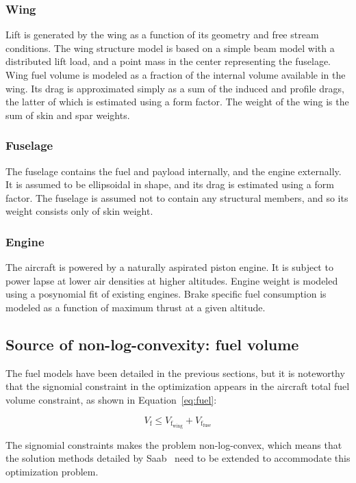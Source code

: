 \subsubsection{Wing}

Lift is generated by the wing as a function of its geometry and free stream conditions.
The wing structure model is based on a simple beam model with a distributed lift load,
and a point mass in the center representing the fuselage.
Wing fuel volume is modeled as a fraction of the internal volume available in the wing.
Its drag is
approximated simply as a sum of the induced and profile drags, the latter of which is estimated using a
form factor. The weight of the wing is the sum of skin and spar weights.

\subsubsection{Fuselage}

The fuselage contains the fuel and payload internally, and the engine externally.
It is assumed to be ellipsoidal in shape, and its drag is estimated using a form factor.
The fuselage is assumed not to contain any structural members, and so its weight consists only of skin weight.

\subsubsection{Engine}

The aircraft is powered by a naturally aspirated piston engine. It is subject to
power lapse at lower air densities at higher altitudes. Engine weight is modeled using a posynomial fit of existing
engines. Brake specific fuel consumption is modeled as a function of maximum thrust at a given altitude.

\subsection{Source of non-log-convexity: fuel volume}
The fuel models have been detailed in the previous sections, but it is noteworthy that
the signomial constraint in the optimization appears in the aircraft total fuel volume constraint,
as shown in Equation~\ref{eq:fuel}:

\begin{equation}
\label{eq:fuel}
V_{\mathrm{f}} \leq V_{\mathrm{f_{wing}}} + V_{\mathrm{f_{fuse}}}
\end{equation}

The signomial constraints makes the problem non-log-convex, which means that the solution methods
detailed by Saab~\cite{Saab2018} need to be extended to accommodate this optimization problem.
